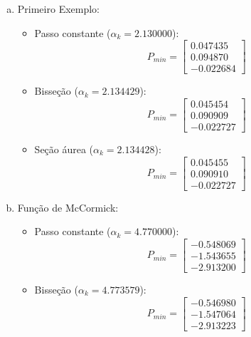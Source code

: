 \documentclass[10pt, a4paper]{article}
\begin{document}
\begin{enumerate}[(a)]
    \item Primeiro Exemplo:
    \begin{itemize}
    \item Passo constante ($\alpha_k = 2.130000$): \\
        \[
            P_{min} = \left[ {\begin{array}{c}
                         0.047435\\ 0.094870\\ -0.022684
        \end{array} } \right]
        \] 
    \item Bisseção ($\alpha_k = 2.134429$): \\
        \[
            P_{min} = \left[ {\begin{array}{c}
                         0.045454\\ 0.090909\\ -0.022727
        \end{array} } \right]
        \] 
    \item Seção áurea ($\alpha_k = 2.134428$): \\
        \[
            P_{min} = \left[ {\begin{array}{c}
                         0.045455\\ 0.090910\\ -0.022727
        \end{array} } \right]
        \]
    \end{itemize}
    \item Função de McCormick:
    \begin{itemize}
    \item Passo constante ($\alpha_k = 4.770000$): \\
        \[
            P_{min} = \left[ {\begin{array}{c}
                         -0.548069\\ -1.543655\\ -2.913200
        \end{array} } \right]
        \] 
    \item Bisseção ($\alpha_k = 4.773579$): \\
        \[
            P_{min} = \left[ {\begin{array}{c}
                         -0.546980\\ -1.547064\\ -2.913223
        \end{array} } \right]
\]
\end{itemize}
\end{enumerate}
\end{document}
